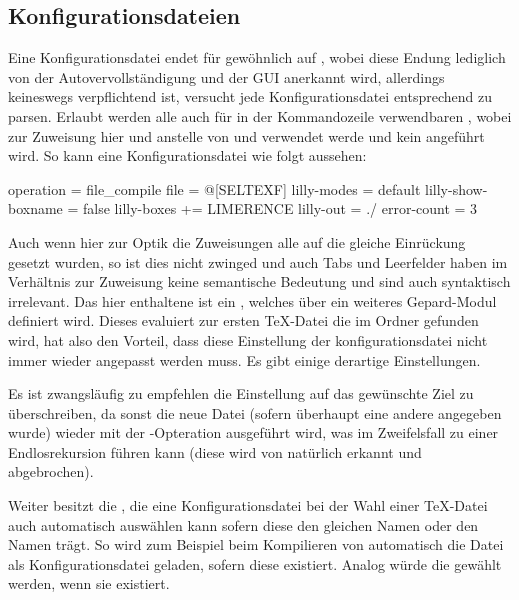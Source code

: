 \subsection{Konfigurationsdateien}
Eine Konfigurationsdatei endet für gewöhnlich auf , wobei diese Endung lediglich von der Autovervollständigung und der GUI anerkannt wird, allerdings keineswegs verpflichtend ist, \Jake versucht jede Konfigurationsdatei entsprechend zu parsen. Erlaubt werden alle auch für \Jake in der Kommandozeile verwendbaren , wobei zur Zuweisung hier \T{=} und \T{+=} anstelle von \T{:} und \T{+:} verwendet werde und kein \say{\T{-}} angeführt wird. So kann eine Konfigurationsdatei wie folgt aussehen:
\begin{gepard}
operation           = file_compile
file                = @[SELTEXF]
lilly-modes         = default
lilly-show-boxname  = false
lilly-boxes        += LIMERENCE
lilly-out           = ./
error-count         = 3
\end{gepard}
Auch wenn hier zur Optik die Zuweisungen alle auf die gleiche Einrückung gesetzt wurden, so ist dies nicht zwinged und auch Tabs und Leerfelder haben im Verhältnis zur Zuweisung keine semantische Bedeutung und sind auch syntaktisch irrelevant. Das hier enthaltene  ist ein , welches über ein weiteres Gepard-Modul definiert wird. Dieses evaluiert zur ersten TeX-Datei die im Ordner gefunden wird, hat also den Vorteil, dass diese Einstellung der konfigurationsdatei nicht immer wieder angepasst werden muss. Es gibt einige derartige Einstellungen.
\begin{bemerkung}
    Es ist zwangsläufig zu empfehlen die Einstellung  auf das gewünschte Ziel zu überschreiben, da sonst die neue Datei (sofern überhaupt eine andere angegeben wurde) wieder mit der -Opteration ausgeführt wird, was im Zweifelsfall zu einer Endlosrekursion führen kann (diese wird von \Jake natürlich erkannt und abgebrochen).
\end{bemerkung}
Weiter besitzt \Jake die  , die eine Konfigurationsdatei bei der Wahl einer TeX-Datei auch automatisch auswählen kann sofern diese den gleichen Namen oder den Namen  trägt. So wird zum Beispiel beim Kompilieren von  automatisch die Datei  als Konfigurationsdatei geladen, sofern diese existiert. Analog würde die  gewählt werden, wenn sie existiert. 
